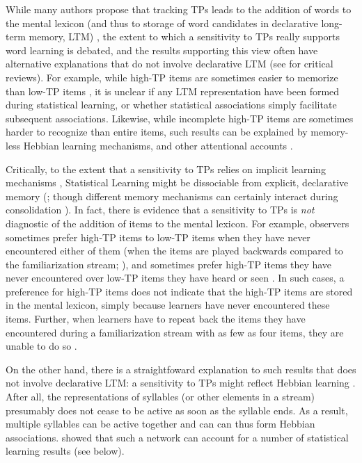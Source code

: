 \documentclass[
]{article}
\begin{document}
While many authors propose that tracking TPs leads to the addition of
words to the mental lexicon (and thus to storage of word candidates in
declarative long-term memory, LTM)
\citep{Erickson2014, Estes2007, Hay2011a, Isbilen2020, Karaman2018, Perruchet2019, Shoaib2018},
the extent to which a sensitivity to TPs really supports word learning
is debated, and the results supporting this view often have alternative
explanations that do not involve declarative LTM (see
\citep{Endress2020, Endress-stat-recall} for critical reviews). For
example, while high-TP items are sometimes easier to memorize than
low-TP items \citep{Estes2007, Hay2011a, Isbilen2020, Karaman2018}, it
is unclear if any LTM representation have been formed during statistical
learning, or whether statistical associations simply facilitate
subsequent associations. Likewise, while incomplete high-TP items are
sometimes harder to recognize than entire items, such results can be
explained by memory-less Hebbian learning mechanisms, and other
attentional accounts \citep{Endress-stat-recall}.

Critically, to the extent that a sensitivity to TPs relies on implicit
learning mechanisms \citep{Christiansen2018, Perruchet2006}, Statistical
Learning might be dissociable from explicit, declarative memory
(\citep{Cohen1980, Finn2016, Graf1984, Knowlton1996a, Poldrack2001, Sherman2020, Squire1992};
though different memory mechanisms can certainly interact during
consolidation \citep{Robertson2022}). In fact, there is evidence that a
sensitivity to TPs is \emph{not} diagnostic of the addition of items to
the mental lexicon. For example, observers sometimes prefer high-TP
items to low-TP items when they have never encountered either of them
(when the items are played backwards compared to the familiarization
stream; \citep{Endress-Action-Axc, Turk-Browne-reversal, Jones2007}),
and sometimes prefer high-TP items they have never encountered over
low-TP items they have heard or seen
\citep{Endress-Phantoms-Vision, Endress-Phantoms}. In such cases, a
preference for high-TP items does not indicate that the high-TP items
are stored in the mental lexicon, simply because learners have never
encountered these items. Further, when learners have to repeat back the
items they have encountered during a familiarization stream with as few
as four items, they are unable to do so \citep{Endress-stat-recall}.

On the other hand, there is a straightfoward explanation to such results
that does not involve declarative LTM: a sensitivity to TPs might
reflect Hebbian learning \citep{Endress-tone-tps, Endress-TP-Model}.
After all, the representations of syllables (or other elements in a
stream) presumably does not cease to be active as soon as the syllable
ends. As a result, multiple syllables can be active together and can can
thus form Hebbian associations. \citep{Endress-TP-Model} showed that
such a network can account for a number of statistical learning results
(see below).
\end{document}
